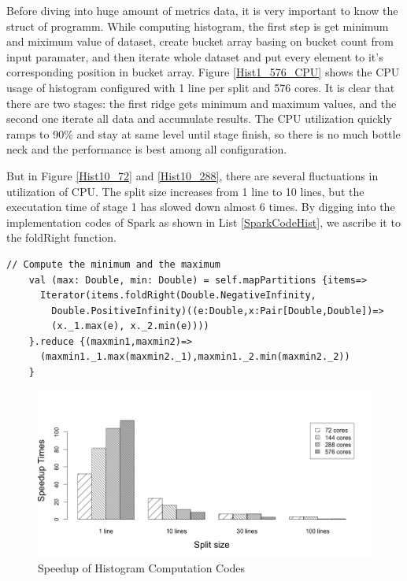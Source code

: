 Before diving into huge amount of metrics data, it is very important to know the struct of programm. While computing histogram, the first step is get minimum and miximum value of dataset, create bucket array basing on bucket count from input paramater, and then iterate whole dataset and put every element to it's corresponding position in bucket array. Figure \ref{Hist1_576_CPU} shows the CPU usage of histogram configured with 1 line per split and 576 cores. It is clear that there are two stages: the first ridge gets minimum and maximum values, and the second one iterate all data and accumulate results. The CPU utilization quickly ramps to 90\% and stay at same level until stage finish, so there is no much bottle neck and the performance is best among all configuration.

But in Figure \ref{Hist10_72} and \ref{Hist10_288}, there are several fluctuations in utilization of CPU. The split size increases from 1 line to 10 lines, but the executation time of stage 1 has slowed down almost 6 times. By digging into the implementation codes of Spark as shown in List \ref{SparkCodeHist}, we ascribe it to the foldRight function. 

\lstset{language=Java,frame=single}
\begin{lstlisting}[float,caption= Codes Snippet of Histogram in Spark , label=SparkCodeHist]
    // Compute the minimum and the maximum
    val (max: Double, min: Double) = self.mapPartitions {items=>
      Iterator(items.foldRight(Double.NegativeInfinity,
        Double.PositiveInfinity)((e:Double,x:Pair[Double,Double])=>
        (x._1.max(e), x._2.min(e))))
    }.reduce {(maxmin1,maxmin2)=>
      (maxmin1._1.max(maxmin2._1),maxmin1._2.min(maxmin2._2))
    }
\end{lstlisting}


\begin{figure}[h]
\centering
\includegraphics[scale=.50]{figures/HistSpeedup.png}
\caption{Speedup of Histogram Computation Codes}
\label{HistSpeedup}
\end{figure}

